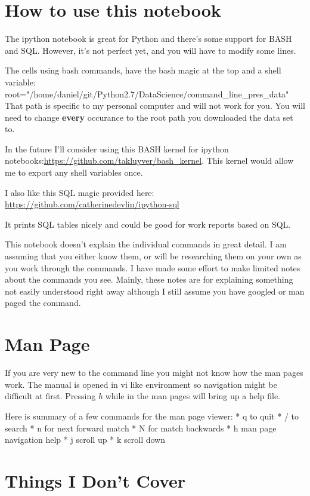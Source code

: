 \documentclass{article}
\begin{document}
\section{How to use this notebook}\label{how-to-use-this-notebook}

The ipython notebook is great for Python and there's some support for
BASH and SQL. However, it's not perfect yet, and you will have to modify
some lines.

The cells using bash commands, have the bash magic at the top and a
shell variable:
root="/home/daniel/git/Python2.7/DataScience/command\_line\_pres\_data"
    That path is specific to my personal computer and will not work for you.
You will need to change \textbf{every} occurance to the root path you
downloaded the data set to.

In the future I'll consider using this BASH kernel for ipython
notebooks:\url{https://github.com/takluyver/bash\_kernel}. This kernel would
allow me to export any shell variables once.

I also like this SQL magic provided here:
\url{https://github.com/catherinedevlin/ipython-sql}

It prints SQL tables nicely and could be good for work reports based on
SQL.

    This notebook doesn't explain the individual commands in great detail. I
am assuming that you either know them, or will be researching them on
your own as you work through the commands. I have made some effort to
make limited notes about the commands you see. Mainly, these notes are
for explaining something not easily understood right away although I
still assume you have googled or man paged the command.

    \section{Man Page}\label{man-page}

If you are very new to the command line you might not know how the man
pages work. The manual is opened in vi like environment so navigation
might be difficult at first. Pressing \emph{h} while in the man pages
will bring up a help file.

Here is summary of a few commands for the man page viewer: * q to quit *
/ to search * n for next forward match * N for match backwards * h man
page navigation help * j scroll up * k scroll down

\section{Things I Don't Cover}\label{things-i-dont-cover}
\end{document}

